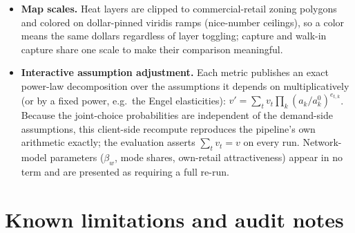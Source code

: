 \documentclass[11pt]{article}
\begin{document}
\begin{itemize}
      neither parsed nor stored.
\item \textbf{Map scales.} Heat layers are clipped to commercial-retail zoning
      polygons and colored on dollar-pinned viridis ramps (nice-number ceilings),
      so a color means the same dollars regardless of layer toggling; capture and
      walk-in capture share one scale to make their comparison meaningful.
\item \textbf{Interactive assumption adjustment.} Each metric publishes an
      exact power-law decomposition over the assumptions it depends on
      multiplicatively (or by a fixed power, e.g.\ the Engel elasticities):
      $v' = \sum_t v_t \prod_k (a_k / a_k^0)^{e_{t,k}}$. Because the joint-choice
      probabilities are independent of the demand-side assumptions, this
      client-side recompute reproduces the pipeline's own arithmetic exactly;
      the evaluation asserts $\sum_t v_t = v$ on every run. Network-model
      parameters ($\beta_w$, mode shares, own-retail attractiveness) appear in
      no term and are presented as requiring a full re-run.
\end{itemize}

\section{Known limitations and audit notes}
\label{sec:limitations}
\end{document}
